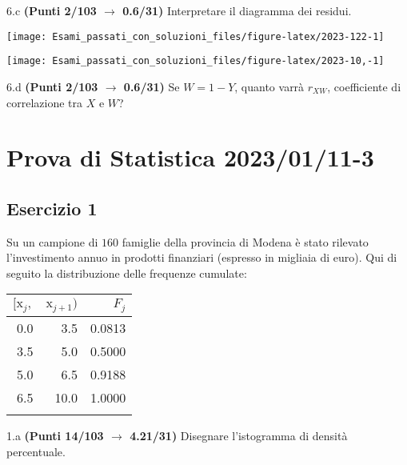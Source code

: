 \documentclass[
  11pt,
]{book}
\theoremstyle{mytheoremstyle}
\theoremstyle{mydefstyle}
\newenvironment{sol}
  {
  \begin{tcolorbox}[enhanced,breakable,arc=0.1mm,boxrule=1pt,colback=white,colframe=iblue,
  title=\bf \fontfamily{lmss}\selectfont \hspace{.5 cm} Soluzione,drop fuzzy shadow]

}{
\end{tcolorbox}
  }
\begin{document}
6.c \textbf{(Punti 2/103 \(\rightarrow\) 0.6/31)} Interpretare il diagramma dei residui.

\begin{center}\texttt{[image: Esami\_passati\_con\_soluzioni\_files/figure-latex/2023-122-1]} \end{center}

\begin{sol}

\begin{center}\texttt{[image: Esami\_passati\_con\_soluzioni\_files/figure-latex/2023-10,-1]} \end{center}

\end{sol}

6.d \textbf{(Punti 2/103 \(\rightarrow\) 0.6/31)} Se \(W= 1 - Y\), quanto varrà \(r_{XW}\), coefficiente di correlazione tra \(X\) e \(W\)?

\section{Prova di Statistica 2023/01/11-3}\label{prova-di-statistica-20230111-3}

\subsection{Esercizio 1}\label{esercizio-1-22}

Su un campione di \(160\) famiglie della provincia di Modena è stato rilevato l'investimento annuo in prodotti finanziari (espresso in migliaia di euro). Qui di seguito la distribuzione delle frequenze cumulate:

\begin{table}[H]
\centering
\begin{tabular}{rrr}
\toprule
$[\text{x}_j,$ & $\text{x}_{j+1})$ & $F_j$\\
\midrule
0.0 & 3.5 & 0.0813\\
3.5 & 5.0 & 0.5000\\
5.0 & 6.5 & 0.9188\\
6.5 & 10.0 & 1.0000\\
 &  & \\
\bottomrule
\end{tabular}
\end{table}

1.a \textbf{(Punti 14/103 \(\rightarrow\) 4.21/31)} Disegnare l'istogramma di densità percentuale.
\end{document}
